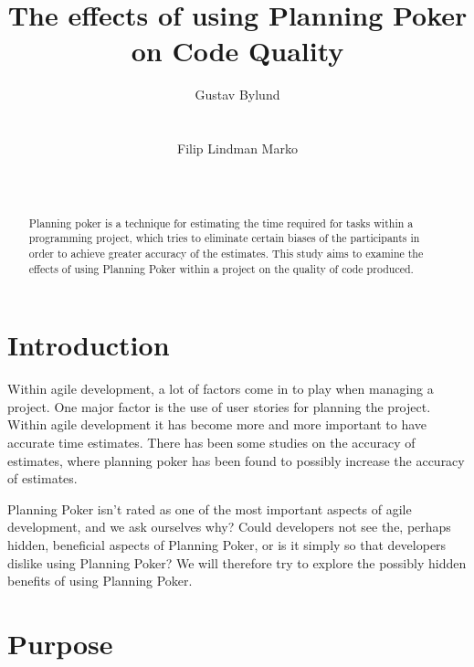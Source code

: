 \documentclass{sigchi}
\begin{document}
\title{The effects of using Planning Poker on Code Quality}

\author{
  \alignauthor Gustav Bylund\\
  \\
    \\
  \alignauthor Filip Lindman Marko\\
    \\
    \\
}

\maketitle

\begin{abstract}
Planning poker is a technique for estimating the time required for tasks
within a programming project, which tries to eliminate certain biases of
the participants in order to achieve greater accuracy of the estimates\cite{grenning2002planning}.
This study aims to examine the effects of using Planning Poker within a project on the quality of code produced.
\end{abstract}


\section{Introduction}
Within agile development, a lot of factors come in to play when managing a project. One major factor is the use of user stories for planning the project.
Within agile development it has become more and more important to have accurate time estimates.
There has been some studies on the accuracy of estimates, where planning poker has been found to
possibly increase the accuracy of estimates\cite{molokken2007combining}.

Planning Poker isn't rated as one of the most important aspects of agile development\cite{Williams:2012:ATT:2133806.2133823}, and we ask ourselves why? Could developers not see the, perhaps hidden, beneficial aspects of Planning Poker, or is it simply so that developers dislike using Planning Poker?
We will therefore try to explore the possibly hidden benefits of using Planning Poker.


\section{Purpose}
\end{document}
